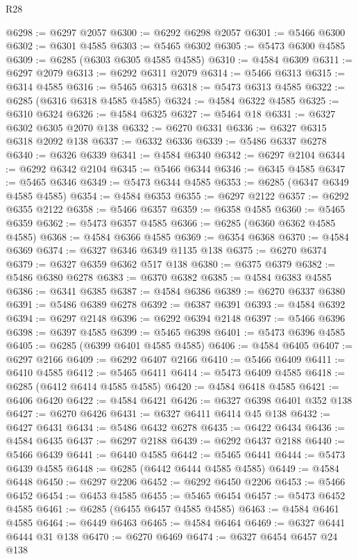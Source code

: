 \begin{lexlean}{R28}
\begin{coremodule}
@6298 := @6297 @2057
@6300 := @6292 @6298 @2057
@6301 := @5466 @6300
@6302 := @6301 @4585
@6303 := @5465 @6302
@6305 := @5473 @6300 @4585
@6309 := @6285 (@6303 @6305 @4585 @4585)
@6310 := @4584 @6309
@6311 := @6297 @2079
@6313 := @6292 @6311 @2079
@6314 := @5466 @6313
@6315 := @6314 @4585
@6316 := @5465 @6315
@6318 := @5473 @6313 @4585
@6322 := @6285 (@6316 @6318 @4585 @4585)
@6324 := @4584 @6322 @4585
@6325 := @6310 @6324
@6326 := @4584 @6325
@6327 := @5464 @18
@6331 := @6327 @6302 @6305 @2070 @138
@6332 := @6270 @6331
@6336 := @6327 @6315 @6318 @2092 @138
@6337 := @6332 @6336
@6339 := @5486 @6337 @6278
@6340 := @6326 @6339
@6341 := @4584 @6340
@6342 := @6297 @2104
@6344 := @6292 @6342 @2104
@6345 := @5466 @6344
@6346 := @6345 @4585
@6347 := @5465 @6346
@6349 := @5473 @6344 @4585
@6353 := @6285 (@6347 @6349 @4585 @4585)
@6354 := @4584 @6353
@6355 := @6297 @2122
@6357 := @6292 @6355 @2122
@6358 := @5466 @6357
@6359 := @6358 @4585
@6360 := @5465 @6359
@6362 := @5473 @6357 @4585
@6366 := @6285 (@6360 @6362 @4585 @4585)
@6368 := @4584 @6366 @4585
@6369 := @6354 @6368
@6370 := @4584 @6369
@6374 := @6327 @6346 @6349 @1135 @138
@6375 := @6270 @6374
@6379 := @6327 @6359 @6362 @517 @138
@6380 := @6375 @6379
@6382 := @5486 @6380 @6278
@6383 := @6370 @6382
@6385 := @4584 @6383 @4585
@6386 := @6341 @6385
@6387 := @4584 @6386
@6389 := @6270 @6337 @6380
@6391 := @5486 @6389 @6278
@6392 := @6387 @6391
@6393 := @4584 @6392
@6394 := @6297 @2148
@6396 := @6292 @6394 @2148
@6397 := @5466 @6396
@6398 := @6397 @4585
@6399 := @5465 @6398
@6401 := @5473 @6396 @4585
@6405 := @6285 (@6399 @6401 @4585 @4585)
@6406 := @4584 @6405
@6407 := @6297 @2166
@6409 := @6292 @6407 @2166
@6410 := @5466 @6409
@6411 := @6410 @4585
@6412 := @5465 @6411
@6414 := @5473 @6409 @4585
@6418 := @6285 (@6412 @6414 @4585 @4585)
@6420 := @4584 @6418 @4585
@6421 := @6406 @6420
@6422 := @4584 @6421
@6426 := @6327 @6398 @6401 @352 @138
@6427 := @6270 @6426
@6431 := @6327 @6411 @6414 @45 @138
@6432 := @6427 @6431
@6434 := @5486 @6432 @6278
@6435 := @6422 @6434
@6436 := @4584 @6435
@6437 := @6297 @2188
@6439 := @6292 @6437 @2188
@6440 := @5466 @6439
@6441 := @6440 @4585
@6442 := @5465 @6441
@6444 := @5473 @6439 @4585
@6448 := @6285 (@6442 @6444 @4585 @4585)
@6449 := @4584 @6448
@6450 := @6297 @2206
@6452 := @6292 @6450 @2206
@6453 := @5466 @6452
@6454 := @6453 @4585
@6455 := @5465 @6454
@6457 := @5473 @6452 @4585
@6461 := @6285 (@6455 @6457 @4585 @4585)
@6463 := @4584 @6461 @4585
@6464 := @6449 @6463
@6465 := @4584 @6464
@6469 := @6327 @6441 @6444 @31 @138
@6470 := @6270 @6469
@6474 := @6327 @6454 @6457 @24 @138

\end{coremodule}
\end{lexlean}
